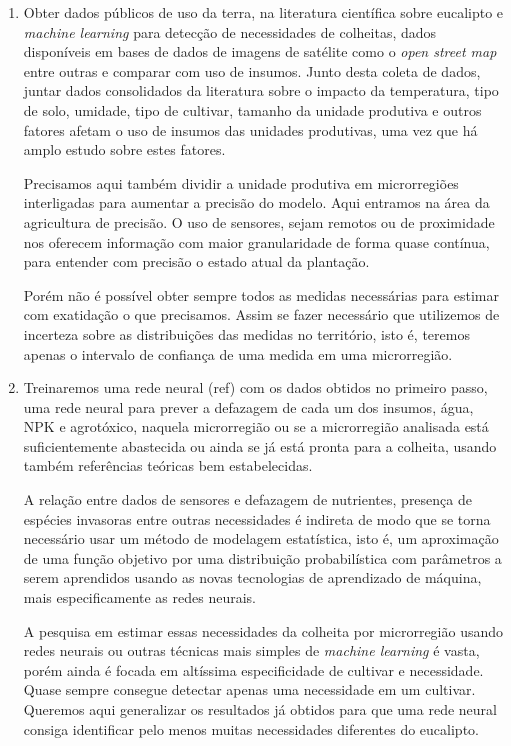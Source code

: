 \documentclass[14pt,a4paper]{article}
\begin{document}
	\begin{enumerate}
		\item Obter dados públicos de uso da terra, na literatura científica sobre eucalipto e \textit{machine learning} para detecção de necessidades de colheitas, dados disponíveis em bases de dados de imagens de satélite como o \textit{open street map} entre outras e comparar com uso de insumos. Junto desta coleta de dados, juntar dados consolidados da literatura sobre o impacto da temperatura, tipo de solo, umidade, tipo de cultivar, tamanho da unidade produtiva e outros fatores afetam o uso de insumos das unidades produtivas, uma vez que há amplo estudo sobre estes fatores. 
		
		Precisamos aqui também dividir a unidade produtiva em microrregiões interligadas para aumentar a precisão do modelo. Aqui entramos na área da agricultura de precisão. O uso de sensores, sejam remotos ou de proximidade nos oferecem informação com maior granularidade de forma quase contínua, para entender com precisão o estado atual da plantação.
		
		Porém não é possível obter sempre todos as medidas necessárias para estimar com exatidação o que precisamos. Assim se fazer necessário que utilizemos de incerteza sobre as distribuições das medidas no território, isto é, teremos apenas o intervalo de confiança de uma medida em uma microrregião.
		
		\item Treinaremos uma rede neural (ref) com os dados obtidos no primeiro passo, uma rede neural para prever a defazagem de cada um dos insumos, água, NPK e agrotóxico, naquela microrregião ou se a microrregião analisada está suficientemente abastecida ou ainda se já está pronta para a colheita, usando também referências teóricas bem estabelecidas.  
		
		A relação entre dados de sensores e defazagem de nutrientes, presença de espécies invasoras entre outras necessidades é indireta de modo que se torna necessário usar um método de modelagem estatística, isto é, um aproximação de uma função objetivo por uma distribuição probabilística com parâmetros a serem aprendidos usando as novas tecnologias de aprendizado de máquina, mais especificamente as redes neurais.
		
		A pesquisa em estimar essas necessidades da colheita por microrregião usando redes neurais ou outras técnicas mais simples de \textit{machine learning} é vasta, porém ainda é focada em altíssima especificidade de cultivar e necessidade. Quase sempre consegue detectar apenas uma necessidade em um cultivar. Queremos aqui generalizar os resultados já obtidos para que uma rede neural consiga identificar pelo menos muitas necessidades diferentes do eucalipto. 
		

\end{enumerate}
\end{document}
